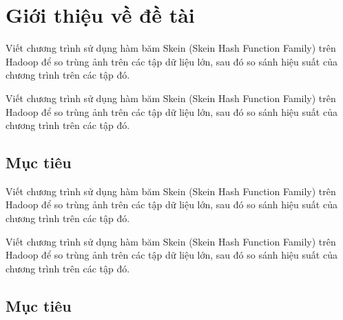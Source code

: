 \documentclass[11pt, a4paper]{article}
\begin{document}
\newpage
\tableofcontents
\newpage

\section{Giới thiệu về đề tài} %
\label{sec:introduction}
Viết chương trình sử dụng hàm băm Skein (Skein Hash Function Family) trên Hadoop để so trùng ảnh trên các tập dữ liệu lớn, sau đó so sánh hiệu suất của chương trình trên các tập đó.

Viết chương trình sử dụng hàm băm Skein (Skein Hash Function Family) trên Hadoop để so trùng ảnh trên các tập dữ liệu lớn, sau đó so sánh hiệu suất của chương trình trên các tập đó.

\subsection{Mục tiêu}
Viết chương trình sử dụng hàm băm Skein (Skein Hash Function Family) trên Hadoop để so trùng ảnh trên các tập dữ liệu lớn, sau đó so sánh hiệu suất của chương trình trên các tập đó.

Viết chương trình sử dụng hàm băm Skein (Skein Hash Function Family) trên Hadoop để so trùng ảnh trên các tập dữ liệu lớn, sau đó so sánh hiệu suất của chương trình trên các tập đó. \cite{web:hadoop_introduction}
\subsection{Mục tiêu}

\clearpage


\end{document}
